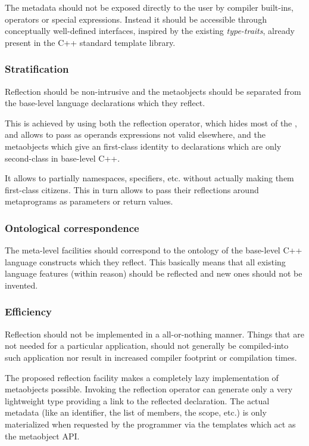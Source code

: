 The metadata should not be exposed directly
to the user by compiler built-ins, operators or special expressions.
Instead it should be accessible through conceptually well-defined interfaces,
inspired by the existing {\em type-traits}, already present in
the C++ standard template library.

\subsubsection{Stratification}
\label{design-stratification}

Reflection should be non-intrusive and the metaobjects should be separated
from the base-level language declarations which they reflect.

This is achieved by using both the reflection operator, which hides most of the
, and allows to pass as operands expressions not valid elsewhere,
and the metaobjects which give an first-class identity to declarations
which are only second-class in base-level C++.

It allows to partially  namespaces, specifiers, etc. without actually
making them first-class citizens. This in turn allows to pass their reflections around
metaprograms as parameters or return values.

\subsubsection{Ontological correspondence}
\label{design-onto-corr}

The meta-level facilities should
correspond to the ontology of the base-level C++ language constructs
which they reflect. This basically means that all existing language
features (within reason) should be reflected and new ones should not be invented.

\subsubsection{Efficiency}
\label{design-efficiency}

Reflection should not be implemented in a all-or-nothing manner.
Things that are not needed for a particular application,
should not generally be compiled-into such application nor result in
increased compiler footprint or compilation times.

The proposed reflection facility makes a completely lazy implementation of
metaobjects possible. Invoking the reflection operator can generate only a very
lightweight type providing a link to the reflected declaration. The actual
metadata (like an identifier, the list of members, the scope, etc.)
 is only materialized when requested by the programmer via the
templates which act as the metaobject API.

